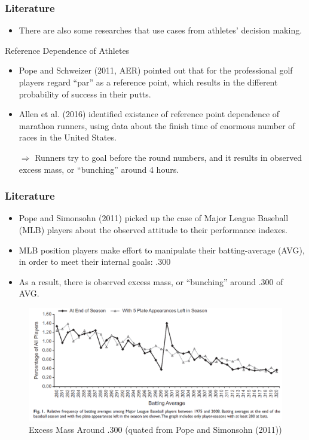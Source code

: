 \documentclass[dvipdfmx,12pt]{beamer}
\begin{document}
\begin{frame}\frametitle{Literature}
  \begin{itemize}
    \item There are also some researches that use cases from athletes' decision making.
  \end{itemize}

    \begin{block}{Reference Dependence of Athletes}
      \begin{itemize}
        \small
        \item Pope and Schweizer (2011, AER) pointed out that for the professional golf players regard ``par'' as a reference point, which results in the different probability of success in their putts.

        \item Allen et al. (2016) identified existance of reference point dependence of marathon runners, using data about the finish time of enormous number of races in the United States.

        $\Rightarrow$ Runners try to goal before the round numbers, and it results in observed excess mass, or ``bunching'' around 4 hours.

      \end{itemize}
    \end{block}
\end{frame}

\begin{frame}\frametitle{Literature}
  \begin{itemize}
    \item Pope and Simonsohn (2011) picked up the case of Major League Baseball (MLB) players about the observed attitude to their performance indexes.

    \item MLB position players make effort to manipulate their batting-average (AVG), in order to meet their internal goals: .300

    \item As a result, there is observed excess mass, or ``bunching'' around .300 of AVG.
  \end{itemize}
  \begin{figure}
    \small
    \includegraphics[keepaspectratio, scale = 0.33]{graphs/PS_fig1}
    \caption{Excess Mass Around .300 (quated from Pope and Simonsohn (2011))}
    \label{PS_fig}
  \end{figure}
\end{frame}
\end{document}
